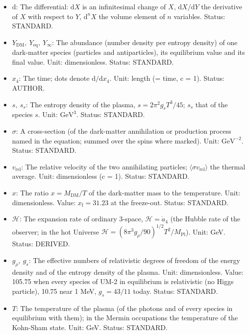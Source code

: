 \documentclass[
  10pt,
]{article}
\providecommand{\tightlist}{%
  \setlength{\itemsep}{0pt}\setlength{\parskip}{0pt}}
\begin{document}
\begin{itemize}
\tightlist
\item
  \(\mathrm{d}\): The differential: \(\mathrm{d}X\) is an infinitesimal
  change of \(X\), \(\mathrm{d}X/\mathrm{d}Y\) the derivative of \(X\)
  with respect to \(Y\), \(\mathrm{d}^nX\) the volume element of \(n\)
  variables. Status: STANDARD.
\item
  \(Y_{\mathrm{DM}},\ Y_{\mathrm{eq}},\ Y_\infty\): The abundance
  (number density per entropy density) of one dark-matter species
  (particles and antiparticles), its equilibrium value and its final
  value. Unit: dimensionless. Status: STANDARD.
\item
  \(x_4\): The time; dots denote \(\mathrm{d}/\mathrm{d}x_4\). Unit:
  length (= time, c = 1). Status: AUTHOR.
\item
  \(s,\ s_s\): The entropy density of the plasma,
  \(s = 2\pi^2g_sT^3/45\); \(s_s\) that of the species \(s\). Unit:
  \(\mathrm{GeV}^{3}\). Status: STANDARD.
\item
  \(\sigma\): A cross-section (of the dark-matter annihilation or
  production process named in the equation; summed over the spins where
  marked). Unit: \(\mathrm{GeV}^{-2}\). Status: STANDARD.
\item
  \(v_{\mathrm{rel}}\): The relative velocity of the two annihilating
  particles; \(\langle\sigma v_{\mathrm{rel}}\rangle\) the thermal
  average. Unit: dimensionless (c = 1). Status: STANDARD.
\item
  \(x\): The ratio \(x = M_{\mathrm{DM}}/T\) of the dark-matter mass to
  the temperature. Unit: dimensionless. Value:
  \(x_{\mathrm{f}} = 31.23\) at the freeze-out. Status: STANDARD.
\item
  \(\mathcal{H}\): The expansion rate of ordinary 3-space,
  \(\mathcal{H} = \dot a_4\) (the Hubble rate of the observer; in the
  hot Universe
  \(\mathcal{H} = (8\pi^3g_\rho/90)^{1/2}T^2/M_{\mathrm{Pl}}\)). Unit:
  GeV. Status: DERIVED.
\item
  \(g_\rho,\ g_s\): The effective numbers of relativistic degrees of
  freedom of the energy density and of the entropy density of the
  plasma. Unit: dimensionless. Value: 105.75 when every species of UM-2
  in equilibrium is relativistic (no Higgs particle), 10.75 near 1 MeV,
  \(g_s = 43/11\) today. Status: STANDARD.
\item
  \(T\): The temperature of the plasma (of the photons and of every
  species in equilibrium with them); in the Mermin occupations the
  temperature of the Kohn-Sham state. Unit: GeV. Status: STANDARD.
\end{itemize}
\end{document}

